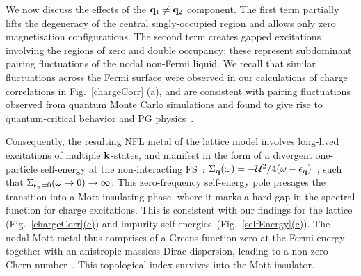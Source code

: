 We now discuss the effects of the ${\bf q}_1 \neq {\bf q}_2$ component. The first term partially lifts the degeneracy of the central singly-occupied region and allows only zero magnetisation configurations. The second term creates gapped excitations involving the regions of zero and double occupancy; these represent subdominant pairing fluctuations of the nodal non-Fermi liquid. We recall that similar fluctuations across the Fermi surface were observed in our calculations of charge correlations in Fig.~\ref{chargeCorr} (a), and are consistent with pairing fluctuations observed from quantum Monte Carlo simulations and found to give rise to quantum-critical behavior and PG physics~\cite{Jiang2022}.

Consequently, the resulting NFL metal of the lattice model involves long-lived excitations of multiple \({\bf k}\)-states, and manifest in the form of a divergent one-particle self-energy at the non-interacting FS~\cite{Phillips2020}:
$\Sigma_{{\bf q}}(\omega) = -\mathcal{U}^2/4(\omega - \epsilon_{\bf q})$~, such that $\Sigma_{\epsilon_{\bf q}=0}(\omega \to 0)  \to \infty$. This zero-frequency self-energy pole presages the transition into a Mott insulating phase, where it marks a hard gap in the spectral function for charge excitations. This is consistent with our findings for the lattice (Fig.~\hyperref[chargeCorr]{\ref*{chargeCorr}(c)}) and impurity self-energies~(Fig.~\hyperref[selfEnergy]{\ref*{selfEnergy}(c)}). The nodal Mott metal thus comprises of a Greens function zero at the Fermi energy together with an anistropic massless Dirac dispersion, leading to a non-zero Chern number~\cite{vafekvishwanath2014,morimoto2016,calderon2025}. This topological index survives into the Mott insulator.

